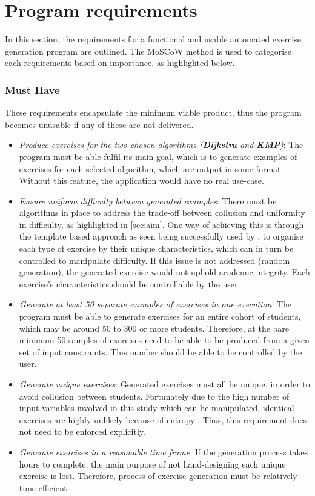 \documentclass{l4proj}
\begin{document}
\section{Program requirements}

In this section, the requirements for a functional and usable automated exercise generation program are outlined. The MoSCoW method is used to categorise each requirements based on importance, as highlighted below.

\subsubsection{Must Have}

These requirements encapsulate the minimum viable product, thus the program becomes unusable if any of these are not delivered.
\begin{itemize}
	\item
	\emph{Produce exercises for the two chosen algorithms (\textbf{Dijkstra} and \textbf{KMP})}: The program must be able fulfil its main goal, which is to generate examples of exercises for each 		selected algorithm, which are output in some format. Without this feature, the application would have no real use-case. 
	\item
	\emph{Ensure uniform difficulty between generated examples}: There must be algorithms in place to address the trade-off between collusion and uniformity in difficulty, as highlighted in \autoref{sec:aim}. One way of achieving this is through the template based approach as seen being successfully used by \cite{Sad12}, to organise each type of exercise by their unique characteristics, which can in turn be controlled to manipulate difficulty. If this issue is not addressed (random generation), the generated exercise would not uphold academic integrity. Each exercise's characteristics should be controllable by the user.
	\item
	\emph{Generate at least 50 separate examples of exercises in one execution}: The program must be able to generate exercises for an entire cohort of students, which may be around 50 to 300 or more students. Therefore, at the bare minimum 50 samples of exercises need to be able to be produced from a given set of input constraints. This number should be able to be controlled by the user.
	\item
	\emph{Generate unique exercises}: Generated exercises must all be unique, in order to avoid collusion between students. Fortunately due to the high number of input variables involved in this study which can be manipulated, identical exercises are highly unlikely because of entropy \cite{}. Thus, this requirement does not need to be enforced explicitly.
	\item
	\emph{Generate exercises in a reasonable time frame}: If the generation process takes hours to complete, the main purpose of not hand-designing each unique exercise is lost. Therefore, process of exercise generation must be relatively time efficient. 
\end{itemize}
\end{document}
